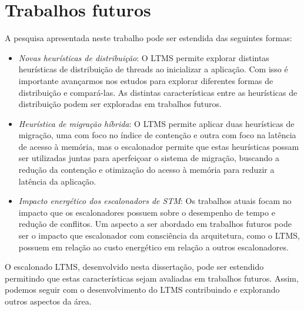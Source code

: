 \documentclass[diss,capa]{texufpel}
\begin{document}
\section{\textbf{Trabalhos futuros}}

A pesquisa apresentada neste trabalho pode ser estendida das seguintes formas:

\begin{itemize}
 \item \emph{Novas heurísticas de distribuição}: O LTMS permite explorar distintas heurísticas de distribuição de threads ao inicializar a aplicação. Com isso é importante avançarmos nos estudos para explorar diferentes formas de distribuição e compará-las. As distintas características entre as heurísticas de distribuição podem ser exploradas em trabalhos futuros. 

 \item \emph{Heurística de migração híbrida}: O LTMS permite aplicar duas heurísticas de migração, uma com foco no índice de contenção e outra com foco na latência de acesso à memória, mas o escalonador permite que estas heurísticas possam ser utilizadas juntas para aperfeiçoar o sistema de migração, buscando a redução da contenção e otimização do acesso à memória para reduzir a latência da aplicação.

 \item \emph{Impacto energético dos escalonadors de STM}: Os trabalhos atuais focam no impacto que os escalonadores possuem sobre o desempenho de tempo e redução de conflitos. Um aspecto a ser abordado em trabalhos futuros pode ser o impacto que escalonador com consciência da arquitetura, como o LTMS, possuem em relação ao custo energético em relação a outros escalonadores.
\end{itemize}

O escalonado LTMS, desenvolvido nesta dissertação, pode ser estendido permitindo que estas características sejam avaliadas em trabalhos futuros. Assim, podemos seguir com o desenvolvimento do LTMS contribuindo e explorando outros aspectos da área.


 




\end{document}
